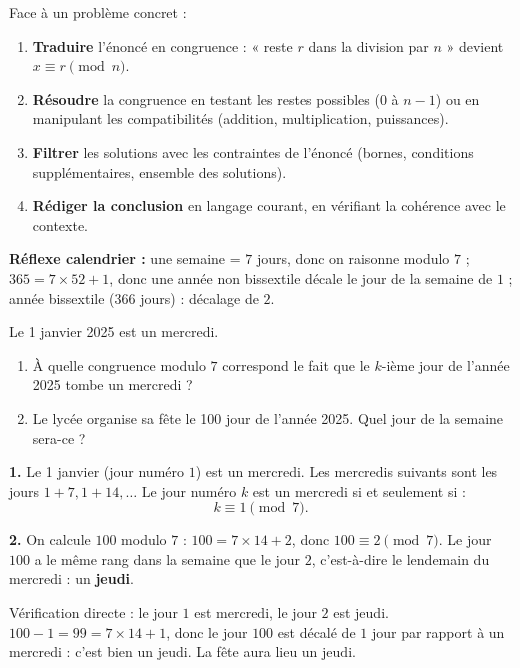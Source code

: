 \documentclass[11pt]{article}
\begin{document}
\begin{methode}
Face à un problème concret :
\begin{enumerate}
\item \textbf{Traduire} l'énoncé en congruence : « reste $r$ dans la division par $n$ » devient $x \equiv r \pmod{n}$.
\item \textbf{Résoudre} la congruence en testant les restes possibles ($0$ à $n-1$) ou en manipulant les compatibilités (addition, multiplication, puissances).
\item \textbf{Filtrer} les solutions avec les contraintes de l'énoncé (bornes, conditions supplémentaires, ensemble des solutions).
\item \textbf{Rédiger la conclusion} en langage courant, en vérifiant la cohérence avec le contexte.
\end{enumerate}
\textbf{Réflexe calendrier :} une semaine = $7$ jours, donc on raisonne modulo $7$ ; $365 = 7 \times 52 + 1$, donc une année non bissextile décale le jour de la semaine de $1$ ; année bissextile ($366$ jours) : décalage de $2$.
\end{methode}

\begin{exoresolu}
Le 1\ier{} janvier 2025 est un mercredi.
\begin{enumerate}
\item À quelle congruence modulo $7$ correspond le fait que le $k$-ième jour de l'année 2025 tombe un mercredi ?
\item Le lycée organise sa fête le 100\ieme{} jour de l'année 2025. Quel jour de la semaine sera-ce ?
\end{enumerate}
\tcblower
\textbf{1.} Le 1\ier{} janvier (jour numéro $1$) est un mercredi. Les mercredis suivants sont les jours $1 + 7, 1 + 14, \ldots$ Le jour numéro $k$ est un mercredi si et seulement si :
\[ k \equiv 1 \pmod{7}. \]

\textbf{2.} On calcule $100$ modulo $7$ : $100 = 7 \times 14 + 2$, donc $100 \equiv 2 \pmod{7}$. Le jour $100$ a le même rang dans la semaine que le jour $2$, c'est-à-dire le lendemain du mercredi : un \textbf{jeudi}.

Vérification directe : le jour $1$ est mercredi, le jour $2$ est jeudi. $100 - 1 = 99 = 7 \times 14 + 1$, donc le jour $100$ est décalé de $1$ jour par rapport à un mercredi : c'est bien un jeudi. La fête aura lieu un $\boxed{\text{jeudi}}$.
\end{exoresolu}
\end{document}
